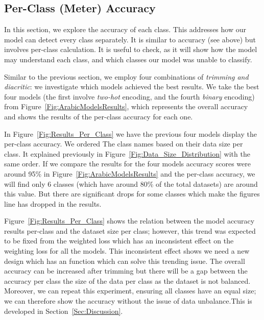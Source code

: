 {\begin{itemize}
\end{itemize}



\subsection{Per-Class (Meter) Accuracy}

In this section, we explore the accuracy of each class. This addresses how our model can detect every class separately. It is similar to accuracy (see above) but involves per-class calculation. It is useful to check, as it will show how the model may understand each class, and which classes our model was unable to classify. 

Similar to the previous section, we employ four combinations of \textit{trimming and diacritic}: we investigate which models achieved the best results. We take the best four models (the first involve \textit{two-hot} encoding, and the fourth \textit{binary} encoding) from Figure~\ref{Fig:ArabicModelsResults}, which represents the overall accuracy and shows the results of the per-class accuracy for each one.

In Figure~\ref{Fig:Results_Per_Class} we have the previous four models display the per-class accuracy. We ordered The class names based on their data size per class. It explained previously in Figure~\ref{Fig:Data_Size_Distribution} with the same order. If we compare the results for the four models accuracy scores were around 95\% in Figure~\ref{Fig:ArabicModelsResults} and the per-class accuracy, we will find only 6 classes (which have around 80\% of the total datasets) are around this value. But there are significant drops for some classes which make the figures line has dropped in the results.


Figure~\ref{Fig:Results_Per_Class} shows the relation between the model accuracy results per-class and the dataset size per class; however, this trend was expected to be fixed from the weighted loss which has an inconsistent effect on the weighting loss for all the models. This inconsistent effect shows we need a new design which has an function which can solve this trending issue. The overall accuracy can be increased after trimming but there will be a gap between the accuracy per class the size of the data per class as the dataset is not balanced. Moreover, we can repeat this experiment, ensuring all classes have an equal size; we can therefore show the accuracy without the issue of data unbalance.This is developed in Section~\ref{Sec:Discussion}.


}
